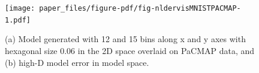\documentclass[
  12pt]{article}
\begin{document}
\begin{figure}[H]

{\centering \texttt{[image: paper\_files/figure-pdf/fig-nldervisMNISTPACMAP-1.pdf]}

}

\caption{\label{fig-nldervisMNISTPACMAP}(a) Model generated with 12 and
15 bins along x and y axes with hexagonal size 0.06 in the 2D space
overlaid on PaCMAP data, and (b) high-D model error in model space.}

\end{figure}

\begin{figure}[H]

\begin{minipage}[t]{0.33\linewidth}

{\centering 


}

\subcaption{\label{fig-mnist1_sc1}}
\end{minipage}%
%
\begin{minipage}[t]{0.33\linewidth}

{\centering 

\raisebox{-\height}{

}}
\end{minipage}
\end{figure}
\end{document}
